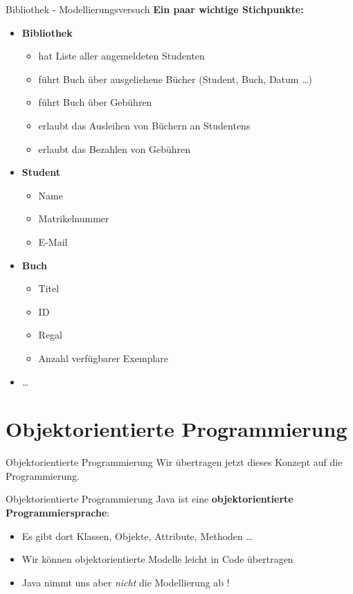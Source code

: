 \documentclass[18pt]{beamer}
\begin{document}
\begin{frame}{Bibliothek - Modellierungsversuch}
    \textbf{Ein paar wichtige Stichpunkte:}
    \begin{itemize}
        \item \textbf{Bibliothek}
        \begin{itemize}
            \item hat Liste aller angemeldeten Studenten
            \item führt Buch über ausgeliehene Bücher (Student, Buch, Datum \dots)
            \item führt Buch über Gebühren
            \item erlaubt das Ausleihen von Büchern an Studentens
            \item erlaubt das Bezahlen von Gebühren
        \end{itemize}
        \pause
        \item \textbf{Student}
        \begin{itemize}
            \item Name
            \item Matrikelnummer
            \item E-Mail
        \end{itemize}
        \pause
        \item \textbf{Buch}
        \begin{itemize}
            \item Titel
            \item ID
            \item Regal
            \item Anzahl verfügbarer Exemplare
        \end{itemize}
        \item \dots
    \end{itemize}

\end{frame}


\section{Objektorientierte Programmierung}

\begin{frame}{Objektorientierte Programmierung}
    Wir übertragen jetzt dieses Konzept auf die Programmierung.
\end{frame}

\begin{frame}{Objektorientierte Programmierung}
    Java ist eine \textbf{objektorientierte Programmiersprache}:
    \begin{itemize}
        \item Es gibt dort Klassen, Objekte, Attribute, Methoden \dots
        \item Wir können objektorientierte Modelle leicht in Code übertragen
        \item Java nimmt uns aber \textit{nicht} die Modellierung ab !
    \end{itemize}
\end{frame}
\end{document}
